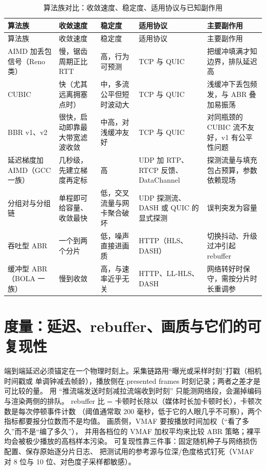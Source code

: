 \documentclass[12pt,a4paper,fontset=fandol]{ctexbook}
\begin{document}
\begin{longtable}{>{\raggedright\arraybackslash}p{}
                  >{\raggedright\arraybackslash}p{}
                  >{\raggedright\arraybackslash}p{}
                  >{\raggedright\arraybackslash}p{}
                  >{\raggedright\arraybackslash}p{}}
\caption{算法族对比：收敛速度、稳定度、适用协议与已知副作用}\label{tab:ch14-algo-family} \\
\toprule
算法族 & 收敛速度 & 稳定度 & 适用协议 & 主要副作用 \\
\midrule
\endfirsthead
\toprule
算法族 & 收敛速度 & 稳定度 & 适用协议 & 主要副作用 \\
\midrule
\endhead
\midrule
\endfoot
\bottomrule
\endlastfoot
AIMD 加丢包信号（Reno 类） & 慢，锯齿周期正比 RTT & 高，行为可预测 &
TCP 与 QUIC & 把缓冲填满才知边界，排队延迟高 \\
CUBIC & 快（尤其远离拥塞点时） & 中，多流公平但短时波动大 & TCP 与 QUIC &
浅缓冲下丢包频发，与 ABR 叠加易振荡 \\
BBR v1、v2 & 很快，启动即靠最大带宽滤波收敛 & 中高，对浅缓冲友好 & TCP 与 QUIC &
对同瓶颈的 CUBIC 流不友好，v1 有公平性问题 \\
延迟梯度加 AIMD（GCC 一族） & 几秒级，先建立梯度再定标 & 高 &
UDP 加 RTP、RTCP 反馈、DataChannel & 探测流量与填充包占预算，参数依赖现场 \\
分组对与分组链 & 单程即可给容量、收敛最快 & 低，交叉流量与网卡聚合破坏 &
UDP 探测流、DASH 或 QUIC 的显式探测 & 误判突发为容量 \\
吞吐型 ABR & 一个到两个分片 & 低，噪声直接进画质 & HTTP（HLS、DASH） &
切换抖动、升级过冲引起 rebuffer \\
缓冲型 ABR（BOLA 一族） & 慢到收敛 & 高，与速率近乎无关 &
HTTP、LL-HLS、DASH & 网络转好时保守，需按分片时长重调参 \\
\end{longtable}

\section{度量：延迟、rebuffer、画质与它们的可复现性}

端到端延迟必须锚定在一个物理时刻上。采集链路用``曝光或采样时刻''打戳（相机时间戳或
单调钟减去帧龄），播放侧在.presented frames 时刻记录；两者之差才是可比较的量。
用 ``推流端发送时刻减拉流端收到时刻'' 只能测网络段，会漏掉编码与渲染两侧的排队。
rebuffer 比 = 卡顿时长除以（媒体时长加卡顿时长），卡顿次数是每次停顿事件计数
（阈值通常取 200 毫秒，低于它的人眼几乎不可察），两个指标都要报分位数而不是均值。
画质侧，VMAF 要按播放时间加权（``看了多久''而不是``编了多久''），
并用各档位的 VMAF 加权平均来比较 ABR 策略；裸平均会被极少播放的高档样本污染。
可复现性靠三件事：固定随机种子与网络损伤配置、保存原始逐分片日志、
把测试用的参考源与位深/色度格式钉死（VMAF 对 8 位与 10 位、对色度子采样都敏感）。
\end{document}
